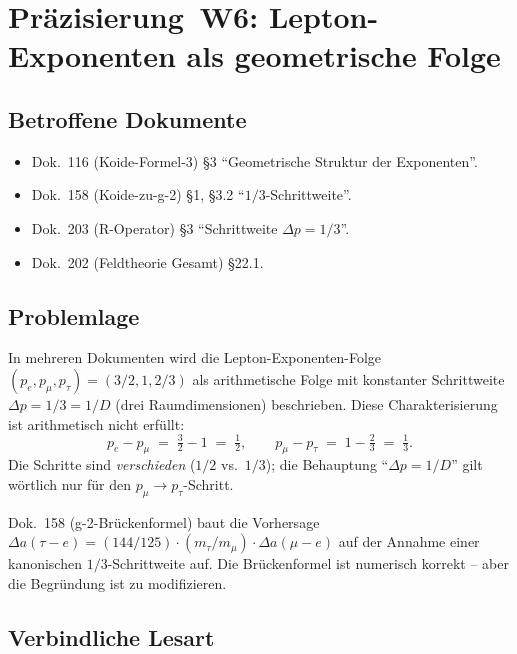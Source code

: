 \section{\texorpdfstring{Präzisierung~W6: Lepton-Exponenten als geometrische Folge}{Praezisierung W6: Lepton-Exponenten als geometrische Folge}}

\subsection*{Betroffene Dokumente}

\begin{itemize}[leftmargin=2em,itemsep=2pt,topsep=2pt]
  \item Dok.~116 (Koide-Formel-3) §3 \enquote{Geometrische Struktur
        der Exponenten}.
  \item Dok.~158 (Koide-zu-g-2) §1, §3.2 \enquote{$1/3$-Schrittweite}.
  \item Dok.~203 (R-Operator) §3 \enquote{Schrittweite $\Delta p = 1/3$}.
  \item Dok.~202 (Feldtheorie Gesamt) §22.1.
\end{itemize}

\subsection*{Problemlage}

In mehreren Dokumenten wird die Lepton-Exponenten-Folge
$(p_e, p_\mu, p_\tau) = (3/2, 1, 2/3)$ als arithmetische Folge mit
konstanter Schrittweite $\Delta p = 1/3 = 1/D$ (drei Raumdimensionen)
beschrieben. Diese Charakterisierung ist arithmetisch nicht erfüllt:
\begin{equation}
  p_e - p_\mu \;=\; \tfrac{3}{2} - 1 \;=\; \tfrac{1}{2},
  \qquad
  p_\mu - p_\tau \;=\; 1 - \tfrac{2}{3} \;=\; \tfrac{1}{3}.
\end{equation}
Die Schritte sind \emph{verschieden} ($1/2$ vs.\ $1/3$); die Behauptung
\enquote{$\Delta p = 1/D$} gilt wörtlich nur für den
$p_\mu \to p_\tau$-Schritt.

Dok.~158 (g-2-Brückenformel) baut die Vorhersage
$\Delta a(\tau{-}e) = (144/125) \cdot (m_\tau/m_\mu) \cdot \Delta a(\mu{-}e)$
auf der Annahme einer kanonischen $1/3$-Schrittweite auf. Die
Brückenformel ist numerisch korrekt -- aber die Begründung ist zu
modifizieren.

\subsection*{Verbindliche Lesart}

